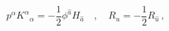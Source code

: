\begin{equation}
\label{dilatonnorm} p^\alpha K^{ \alpha}{}_\alpha =-\frac{1}{2}\phi^{\hat a}
H_{\hat a}\quad,\quad R_u =  -\frac{1}{2}R_{\hat u}\, ,
\end{equation} 
